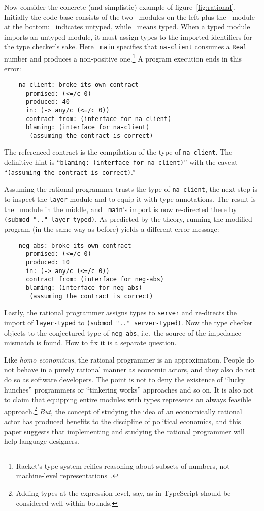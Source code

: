 Now consider the concrete (and simplistic) example of figure~\ref{fig:rational}.
Initially the code base consists of the two \dyncolor\ modules on the left plus
the \typecolor\ module at the bottom; \dyncolor\ indicates untyped, while
\typecolor\ means typed. When a typed module imports an untyped module, it must
assign types to the imported identifiers for the type checker's sake. Here {\tt
main} specifies that {\tt na-client} consumes a {\tt Real} number and produces a
non-positive one.\footnote{Racket's type system reifies
reasoning about subsets of numbers, not machine-level
representations~\citep{stathff-padl-12}.} A program execution ends in this error:
\begin{verbatim}
    na-client: broke its own contract
      promised: (<=/c 0)
      produced: 40
      in: (-> any/c (<=/c 0))           
      contract from: (interface for na-client)
      blaming: (interface for na-client)
       (assuming the contract is correct)
\end{verbatim}
The referenced contract is the compilation of the type of {\tt na-client}. The
definitive hint is ``{\tt blaming: (interface for na-client)}'' with the caveat
``{\tt (assuming the contract is correct)}.''

Assuming the rational programmer trusts the type of {\tt na-client}, the next
step is to inspect the {\tt layer} module and to equip it with type
annotations. The result is the \typecolor\ module in the middle, and {\tt
main}'s import is now re-directed there by {\tt (submod ".." layer-typed)}. As
predicted by the theory, running the modified program (in the same way as before) yields a different error message:
\begin{verbatim}
    neg-abs: broke its own contract
      promised: (<=/c 0)
      produced: 10
      in: (-> any/c (<=/c 0))
      contract from: (interface for neg-abs)
      blaming: (interface for neg-abs)
       (assuming the contract is correct)
\end{verbatim}
Lastly, the rational programmer assigns types to {\tt server} and re-directs
the import of {\tt layer-typed} to {\tt (submod ".." server-typed)}. Now the
type checker objects to the conjectured type of {\tt neg-abs}, i.e.\ the source
of the impedance mismatch is found. How to fix it is a separate question.

Like {\it homo economicus\/}, the rational programmer is an approximation.
People do not behave in a purely rational manner as economic actors, and they
also do not do so as software developers. The point is not to deny the existence
of ``lucky hunches'' programmers or ``tinkering works'' approaches and so on. It
is also not to claim that equipping entire modules with types represents an
always feasible approach.\footnote{Adding types at the expression level, say, as
in TypeScript should be considered well within bounds.}  {\em But\/}, the
concept of studying the idea of an economically rational actor has produced
benefits to the discipline of political economics, and this paper suggests that
implementing and studying the rational programmer will help language designers.



